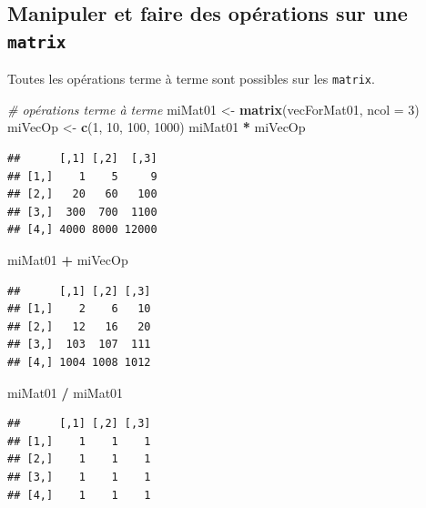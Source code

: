 \documentclass[
]{book}
\newenvironment{Shaded}{\begin{snugshade}}{\end{snugshade}}
\newcommand{\CommentTok}[1]{\textcolor[rgb]{0.56,0.35,0.01}{\textit{#1}}}
\newcommand{\DataTypeTok}[1]{\textcolor[rgb]{0.13,0.29,0.53}{#1}}
\newcommand{\DecValTok}[1]{\textcolor[rgb]{0.00,0.00,0.81}{#1}}
\newcommand{\KeywordTok}[1]{\textcolor[rgb]{0.13,0.29,0.53}{\textbf{#1}}}
\newcommand{\NormalTok}[1]{#1}
\newcommand{\OperatorTok}[1]{\textcolor[rgb]{0.81,0.36,0.00}{\textbf{#1}}}
\newcommand{\StringTok}[1]{\textcolor[rgb]{0.31,0.60,0.02}{#1}}
\begin{document}
\hypertarget{manipuler-et-faire-des-opuxe9rations-sur-une-matrix}{%
\subsection{\texorpdfstring{Manipuler et faire des opérations sur une \texttt{matrix}}{Manipuler et faire des opérations sur une matrix}}\label{manipuler-et-faire-des-opuxe9rations-sur-une-matrix}}

Toutes les opérations terme à terme sont possibles sur les \texttt{matrix}.

\begin{Shaded}
\begin{Highlighting}[]
\CommentTok{# opérations terme à terme}
\NormalTok{miMat01 <-}\StringTok{ }\KeywordTok{matrix}\NormalTok{(vecForMat01, }\DataTypeTok{ncol =} \DecValTok{3}\NormalTok{)}
\NormalTok{miVecOp <-}\StringTok{ }\KeywordTok{c}\NormalTok{(}\DecValTok{1}\NormalTok{, }\DecValTok{10}\NormalTok{, }\DecValTok{100}\NormalTok{, }\DecValTok{1000}\NormalTok{)}
\NormalTok{miMat01 }\OperatorTok{*}\StringTok{ }\NormalTok{miVecOp}
\end{Highlighting}
\end{Shaded}

\begin{verbatim}
##      [,1] [,2]  [,3]
## [1,]    1    5     9
## [2,]   20   60   100
## [3,]  300  700  1100
## [4,] 4000 8000 12000
\end{verbatim}

\begin{Shaded}
\begin{Highlighting}[]
\NormalTok{miMat01 }\OperatorTok{+}\StringTok{ }\NormalTok{miVecOp}
\end{Highlighting}
\end{Shaded}

\begin{verbatim}
##      [,1] [,2] [,3]
## [1,]    2    6   10
## [2,]   12   16   20
## [3,]  103  107  111
## [4,] 1004 1008 1012
\end{verbatim}

\begin{Shaded}
\begin{Highlighting}[]
\NormalTok{miMat01 }\OperatorTok{/}\StringTok{ }\NormalTok{miMat01}
\end{Highlighting}
\end{Shaded}

\begin{verbatim}
##      [,1] [,2] [,3]
## [1,]    1    1    1
## [2,]    1    1    1
## [3,]    1    1    1
## [4,]    1    1    1
\end{verbatim}
\end{document}
